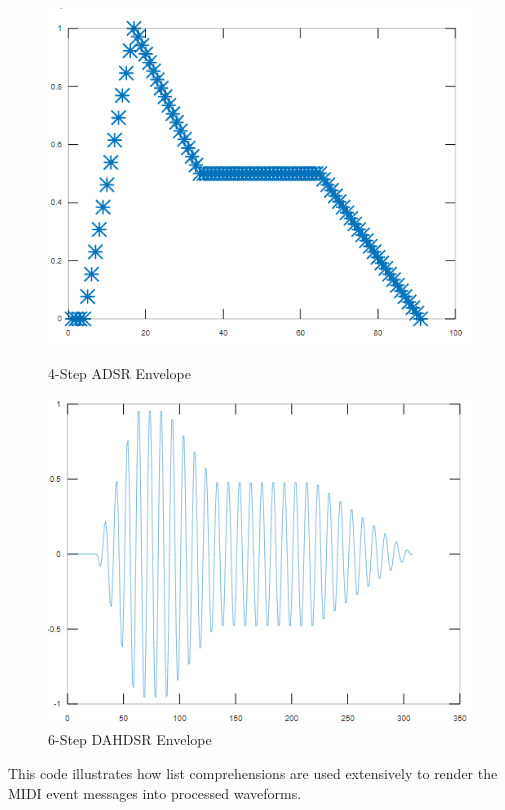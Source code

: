 \documentclass[a0,portrait]{a0poster}
\begin{document}
\begin{sectbox}
\begin{figure}[H]
  \centering
  \begin{minipage}[b]{0.45\textwidth}
    \includegraphics[width=\textwidth]{ADSR.png}
    \caption{4-Step ADSR Envelope}
    \label{fig:ADSR}
  \end{minipage}
  \hfill
  \begin{minipage}[b]{0.45\textwidth}
    \includegraphics[width=\textwidth]{DAHDSR.png}
    \caption{6-Step DAHDSR Envelope}
    \label{fig:DAHDSR}
  \end{minipage}
\end{figure}
This code illustrates how list comprehensions are used extensively to render the MIDI event messages into processed waveforms.

\end{sectbox}
\end{document}
